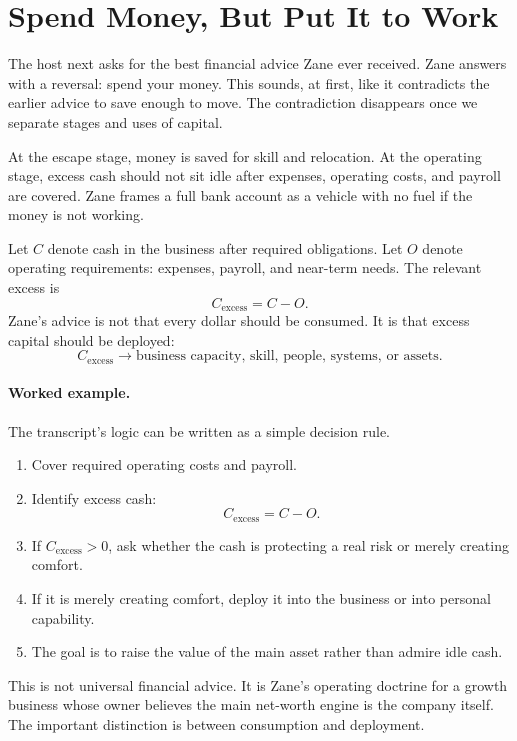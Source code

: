 \section{Spend Money, But Put It to Work}

The host next asks for the best financial advice Zane ever received. Zane answers with a reversal: spend your money. This sounds, at first, like it contradicts the earlier advice to save enough to move. The contradiction disappears once we separate stages and uses of capital.

At the escape stage, money is saved for skill and relocation. At the operating stage, excess cash should not sit idle after expenses, operating costs, and payroll are covered. Zane frames a full bank account as a vehicle with no fuel if the money is not working.

Let \(C\) denote cash in the business after required obligations. Let \(O\) denote operating requirements: expenses, payroll, and near-term needs. The relevant excess is
\begin{equation}
C_{\mathrm{excess}} = C - O.
\end{equation}
Zane's advice is not that every dollar should be consumed. It is that excess capital should be deployed:
\begin{equation}
C_{\mathrm{excess}}
\longrightarrow
\text{business capacity, skill, people, systems, or assets}.
\end{equation}

\paragraph{Worked example.}
The transcript's logic can be written as a simple decision rule.

\begin{enumerate}
\item Cover required operating costs and payroll.
\item Identify excess cash:
\[
C_{\mathrm{excess}}=C-O.
\]
\item If \(C_{\mathrm{excess}}>0\), ask whether the cash is protecting a real risk or merely creating comfort.
\item If it is merely creating comfort, deploy it into the business or into personal capability.
\item The goal is to raise the value of the main asset rather than admire idle cash.
\end{enumerate}

This is not universal financial advice. It is Zane's operating doctrine for a growth business whose owner believes the main net-worth engine is the company itself. The important distinction is between consumption and deployment.

